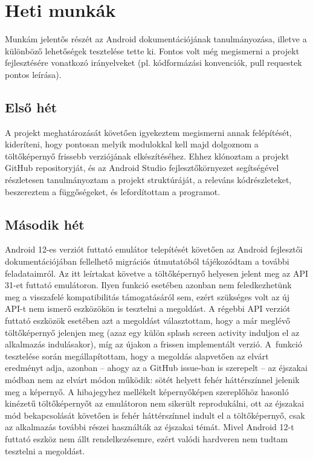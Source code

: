 \chapter{Heti munkák}
Munkám jelentős részét az Android dokumentációjának tanulmányozása, illetve a különböző lehetőségek
tesztelése tette ki. Fontos volt még megismerni a projekt fejlesztésére vonatkozó irányelveket
(pl. kódformázási konvenciók, pull requestek pontos leírása).

\section{Első hét}
A projekt meghatározását követően igyekeztem megismerni annak felépítését, kideríteni, hogy
pontosan melyik modulokkal kell majd dolgoznom a töltőképernyő frissebb verziójának elkészítéséhez.
Ehhez klónoztam a projekt GitHub repositoryját, és az Android Studio fejlesztőkörnyezet
segítségével részletesen tanulmányoztam a projekt struktúráját, a releváns kódrészleteket,
beszereztem a függőségeket, és lefordítottam a programot.

\section{Második hét}
Android 12-es verziót futtató emulátor telepítését követően az Android fejlesztői
dokumentációjában fellelhető migrációs útmutatóból tájékozódtam a további feladataimról.
Az itt leírtakat követve a töltőképernyő helyesen jelent meg az API 31-et futtató emulátoron.
Ilyen funkció esetében azonban nem feledkezhetünk meg a visszafelé kompatibilitás támogatásáról
sem, ezért szükséges volt az új API-t nem ismerő eszközökön is tesztelni a megoldást.
A régebbi API verziót futtató eszközök esetében azt a megoldást választottam, hogy a már meglévő
töltőképernyő jelenjen meg (azaz egy külön splash screen activity induljon el az alkalmazás
indulásakor), míg az újakon a frissen implementált verzió. A~funkció tesztelése során
megállapítottam, hogy a megoldás alapvetően az elvárt eredményt adja, azonban -- ahogy az a
GitHub issue-ban is szerepelt -- az éjszakai módban nem az elvárt módon működik: sötét helyett
fehér háttérszínnel jelenik meg a képernyő. A hibajegyhez mellékelt képernyőképen szereplőhöz
hasonló kinézetű töltőképernyőt az emulátoron nem sikerült reprodukálni, ott az éjszakai mód
bekapcsolását követően is fehér háttérszínnel indult el a töltőképernyő, csak az alkalmazás
további részei használták az éjszakai témát. Mivel Android 12-t futtató eszköz nem állt
rendelkezésemre, ezért valódi hardveren nem tudtam tesztelni a megoldást.

